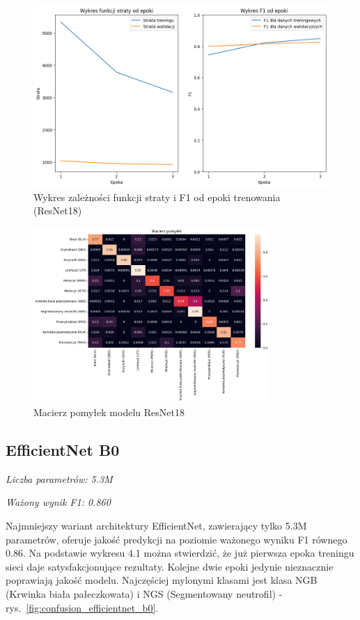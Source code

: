 \begin{figure}
    \centering
    \includegraphics[width=\textwidth]{experiments/resnet18/combined}
    \caption{Wykres zależności funkcji straty i F1 od epoki trenowania (ResNet18)}
    \label{fig:plot_resnet18}
\end{figure}
\begin{figure}
    \centering
    \includegraphics[width=0.8\textwidth]{experiments/resnet18/confusion_matrix}
    \caption{Macierz pomyłek modelu ResNet18}
    \label{fig:confusion_resnet18}
\end{figure}

\subsection{EfficientNet B0}
\textit{Liczba parametrów: 5.3M}

\textit{Ważony wynik F1: 0.860}

Najmniejszy wariant architektury EfficientNet, zawierający tylko 5.3M parametrów, oferuje jakość predykcji na poziomie ważonego wyniku F1 równego 0.86.
Na podstawie wykresu 4.1 można stwierdzić, że już pierwsza epoka treningu sieci daje satysfakcjonujące rezultaty.
Kolejne dwie epoki jedynie nieznacznie poprawiają jakość modelu.
Najczęściej mylonymi klasami jest klasa NGB (Krwinka biała pałeczkowata) i NGS (Segmentowany neutrofil) - rys.~\ref{fig:confusion_efficientnet_b0}.

